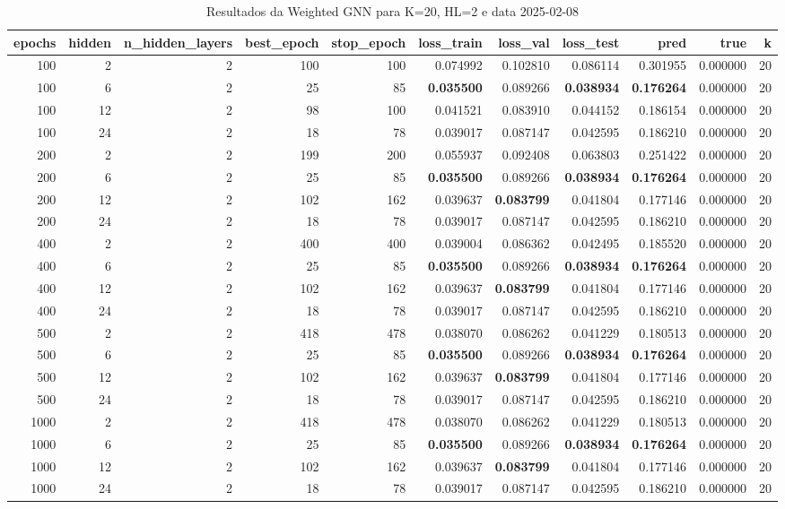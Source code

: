 \begin{table}
\caption{Resultados da Weighted GNN para K=20, HL=2 e data 2025-02-08}
\label{tab:weighted_gnn_results_k20_hl2_d20250208}
\begin{tabular}{rrrrrrrrrrr}
\toprule
epochs & hidden & n\_hidden\_layers & best\_epoch & stop\_epoch & loss\_train & loss\_val & loss\_test & pred & true & k \\
\midrule
100 & 2 & 2 & 100 & 100 & 0.074992 & 0.102810 & 0.086114 & 0.301955 & 0.000000 & 20 \\
100 & 6 & 2 & 25 & 85 & \textbf{0.035500} & 0.089266 & \textbf{0.038934} & \textbf{0.176264} & 0.000000 & 20 \\
100 & 12 & 2 & 98 & 100 & 0.041521 & 0.083910 & 0.044152 & 0.186154 & 0.000000 & 20 \\
100 & 24 & 2 & 18 & 78 & 0.039017 & 0.087147 & 0.042595 & 0.186210 & 0.000000 & 20 \\
200 & 2 & 2 & 199 & 200 & 0.055937 & 0.092408 & 0.063803 & 0.251422 & 0.000000 & 20 \\
200 & 6 & 2 & 25 & 85 & \textbf{0.035500} & 0.089266 & \textbf{0.038934} & \textbf{0.176264} & 0.000000 & 20 \\
200 & 12 & 2 & 102 & 162 & 0.039637 & \textbf{0.083799} & 0.041804 & 0.177146 & 0.000000 & 20 \\
200 & 24 & 2 & 18 & 78 & 0.039017 & 0.087147 & 0.042595 & 0.186210 & 0.000000 & 20 \\
400 & 2 & 2 & 400 & 400 & 0.039004 & 0.086362 & 0.042495 & 0.185520 & 0.000000 & 20 \\
400 & 6 & 2 & 25 & 85 & \textbf{0.035500} & 0.089266 & \textbf{0.038934} & \textbf{0.176264} & 0.000000 & 20 \\
400 & 12 & 2 & 102 & 162 & 0.039637 & \textbf{0.083799} & 0.041804 & 0.177146 & 0.000000 & 20 \\
400 & 24 & 2 & 18 & 78 & 0.039017 & 0.087147 & 0.042595 & 0.186210 & 0.000000 & 20 \\
500 & 2 & 2 & 418 & 478 & 0.038070 & 0.086262 & 0.041229 & 0.180513 & 0.000000 & 20 \\
500 & 6 & 2 & 25 & 85 & \textbf{0.035500} & 0.089266 & \textbf{0.038934} & \textbf{0.176264} & 0.000000 & 20 \\
500 & 12 & 2 & 102 & 162 & 0.039637 & \textbf{0.083799} & 0.041804 & 0.177146 & 0.000000 & 20 \\
500 & 24 & 2 & 18 & 78 & 0.039017 & 0.087147 & 0.042595 & 0.186210 & 0.000000 & 20 \\
1000 & 2 & 2 & 418 & 478 & 0.038070 & 0.086262 & 0.041229 & 0.180513 & 0.000000 & 20 \\
1000 & 6 & 2 & 25 & 85 & \textbf{0.035500} & 0.089266 & \textbf{0.038934} & \textbf{0.176264} & 0.000000 & 20 \\
1000 & 12 & 2 & 102 & 162 & 0.039637 & \textbf{0.083799} & 0.041804 & 0.177146 & 0.000000 & 20 \\
1000 & 24 & 2 & 18 & 78 & 0.039017 & 0.087147 & 0.042595 & 0.186210 & 0.000000 & 20 \\
\bottomrule
\end{tabular}
\end{table}

